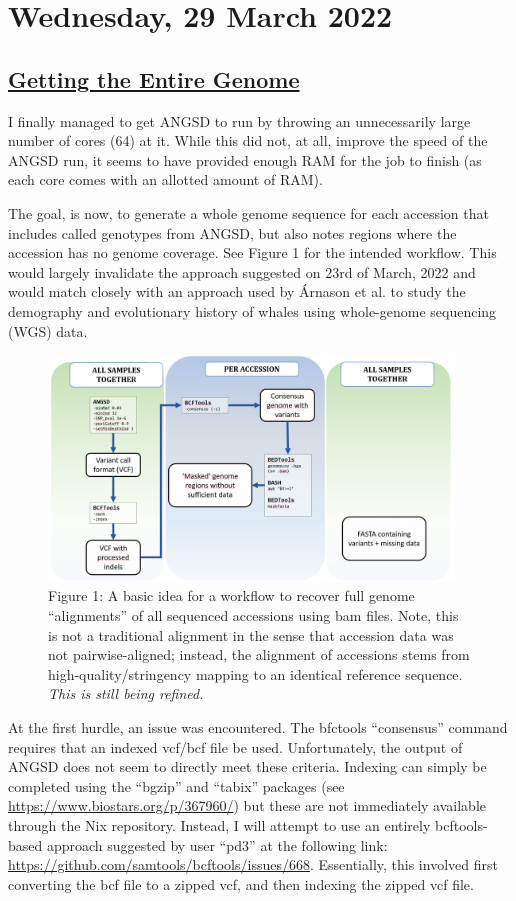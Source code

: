 \documentclass[12pt]{report}
\begin{document}
\section*{Wednesday, 29 March 2022}
\subsection*{\underline{Getting the Entire Genome}}

I finally managed to get ANGSD to run by throwing an unnecessarily large number of cores (64) at it. While this did not, at all, improve the speed of the ANGSD run, it seems to have provided enough RAM for the job to finish (as each core comes with an allotted amount of RAM).

The goal, is now, to generate a whole genome sequence for each accession that includes called genotypes from ANGSD, but also notes regions where the accession has no genome coverage. See Figure 1 for the intended workflow. This would largely invalidate the approach suggested on 23rd of March, 2022 and would match closely with an approach used by \'Arnason et al. \cite{arnason2018} to study the demography and evolutionary history of whales using whole-genome sequencing (WGS) data.

\begin{figure}[!h]
        \centering
        \includegraphics[height=6cm]{Images/alignment_workflow.PNG}
        \caption{Figure 1: A basic idea for a workflow to recover full genome ``alignments'' of all sequenced accessions using bam files. Note, this is not a traditional alignment in the sense that accession data was not pairwise-aligned; instead, the alignment of accessions stems from high-quality/stringency mapping to an identical reference sequence. \emph{This is still being refined.}}
\end{figure}

At the first hurdle, an issue was encountered. The bfctools ``consensus'' command requires that an indexed vcf/bcf file be used. Unfortunately, the output of ANGSD does not seem to directly meet these criteria. Indexing can simply be completed using the ``bgzip'' and ``tabix'' packages (see \url{https://www.biostars.org/p/367960/}) but these are not immediately available through the Nix repository. Instead, I will attempt to use an entirely bcftools-based approach suggested by user ``pd3'' at the following link: \url{https://github.com/samtools/bcftools/issues/668}. Essentially, this involved first converting the bcf file to a zipped vcf, and then indexing the zipped vcf file.
\end{document}
